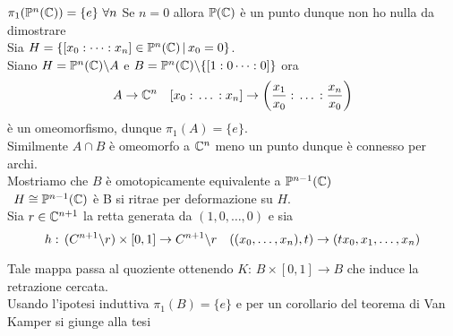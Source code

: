 \begin{ese}$\pi_1(\mathbb{P}^n(\mathbb{C}))= \{ e\} \, \, \forall n $
\proof Se $n=0$ allora $\mathbb{P}(\mathbb{C})$ \`e un punto dunque non ho nulla da dimostrare\\
Sia $H=\{ [ x_0:\dots : x_n] \in \mathbb{P}^n(\mathbb{C})\, \vert \, x_0=0\}$.\\
Siano $H=\mathbb{P}^n(\mathbb{C})\backslash A $ e $B=\mathbb{P}^n(\mathbb{C}) \backslash \{ [1:0\dots : 0]\}$ ora 
$$ A \to \mathbb{C}^n \quad [x_0:\,\dots \, : x_n] \to \left( \frac{x_1}{x_0}: \, \dots \, : \frac{x_n}{x_0}\right) $$ 
\`e un omeomorfismo, dunque $\pi_1(A)=\{ e \} $.\\
Similmente $A\cap B$ \`e omeomorfo a $\mathbb{C}^n$ meno un punto dunque \`e connesso per archi.\\
Mostriamo che $B$ \`e omotopicamente equivalente a $\mathbb{P}^{n-1}(\mathbb{C})$\\\
$H \cong \mathbb{P}^{n-1}(\mathbb{C})$ \`e B si ritrae per deformazione su $H$.\\
Sia $r\in \mathbb{C}^{n+1} $ la retta generata da $(1,0,\dots, 0)$ e sia $$h:\, (C^{n+1} \backslash r )\times [0,1]\to C^{n+1}\backslash r \quad ((x_0, \dots, x_n), t) \to (tx_0, x_1,\dots, x_n)$$

Tale mappa passa al quoziente ottenendo $K:\, B \times [0,1] \to B$ che induce la retrazione cercata.\\
Usando l'ipotesi induttiva  $\pi_1(B)=\{ e \} $ e per un corollario del teorema di Van Kamper si giunge alla tesi
\end{ese}
\newpage
